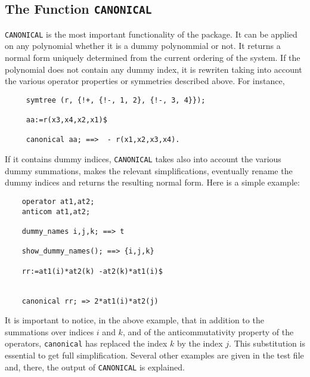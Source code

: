 \subsection{The Function {\tt CANONICAL}}
{\tt CANONICAL} is the most important functionality of the package.
It can be applied on any polynomial whether it is a dummy polynommial 
or not. It returns a normal form uniquely determined 
from the current ordering of the system.  
If the polynomial does not contain any dummy index, it is rewriten
taking into account the various operator properties or symmetries described 
above.
For instance, 
\begin{verbatim}
     symtree (r, {!+, {!-, 1, 2}, {!-, 3, 4}});

     aa:=r(x3,x4,x2,x1)$

     canonical aa; ==>  - r(x1,x2,x3,x4).
\end{verbatim}
If it contains dummy indices, {\tt CANONICAL} takes also into account the 
various dummy summations, makes the relevant simplifications, 
eventually rename the dummy indices  and returns the resulting normal form.
Here is a simple example:
\begin{verbatim}
    operator at1,at2;
    anticom at1,at2;

    dummy_names i,j,k; ==> t

    show_dummy_names(); ==> {i,j,k}

    rr:=at1(i)*at2(k) -at2(k)*at1(i)$
                     

    canonical rr; => 2*at1(i)*at2(j)
\end{verbatim}
It is important to notice, in the above example, that in addition to 
the summations over indices $i$ and $k$, and of the anticommutativity 
property of the operators, {\tt canonical} has replaced the index $k$
by the index $j$. This substitution is essential to get full simplification.
Several other examples are given in the test file and, there, the output
of {\tt CANONICAL} is explained.   

